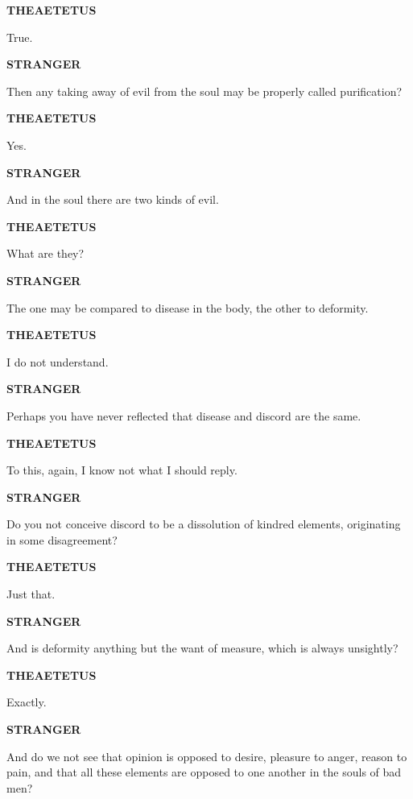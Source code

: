\documentclass[11pt,letter]{article}
\begin{document}
\par \textbf{THEAETETUS}
\par   True.

\par \textbf{STRANGER}
\par   Then any taking away of evil from the soul may be properly called purification?

\par \textbf{THEAETETUS}
\par   Yes.

\par \textbf{STRANGER}
\par   And in the soul there are two kinds of evil.

\par \textbf{THEAETETUS}
\par   What are they?

\par \textbf{STRANGER}
\par   The one may be compared to disease in the body, the other to deformity.

\par \textbf{THEAETETUS}
\par   I do not understand.

\par \textbf{STRANGER}
\par   Perhaps you have never reflected that disease and discord are the same.

\par \textbf{THEAETETUS}
\par   To this, again, I know not what I should reply.

\par \textbf{STRANGER}
\par   Do you not conceive discord to be a dissolution of kindred elements, originating in some disagreement?

\par \textbf{THEAETETUS}
\par   Just that.

\par \textbf{STRANGER}
\par   And is deformity anything but the want of measure, which is always unsightly?

\par \textbf{THEAETETUS}
\par   Exactly.

\par \textbf{STRANGER}
\par   And do we not see that opinion is opposed to desire, pleasure to anger, reason to pain, and that all these elements are opposed to one another in the souls of bad men?
\end{document}
